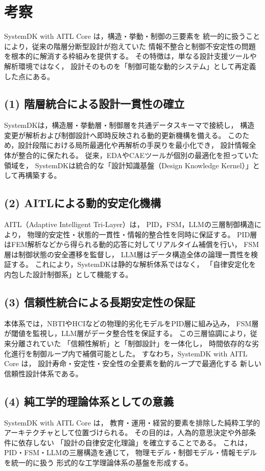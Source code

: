 \section{考察}

SystemDK with AITL Core は，構造・挙動・制御の三要素を
統一的に扱うことにより，従来の階層分断型設計が抱えていた
情報不整合と制御不安定性の問題を根本的に解消する枠組みを提供する。
その特徴は，単なる設計支援ツールや解析環境ではなく，
設計そのものを「制御可能な動的システム」として再定義した点にある。

\subsection{(1) 階層統合による設計一貫性の確立}
SystemDKは，構造層・挙動層・制御層を共通データスキーマで接続し，
構造変更が解析および制御設計へ即時反映される動的更新機構を備える。
このため，設計段階における局所最適化や再解析の手戻りを最小化でき，
設計情報全体が整合的に保たれる。
従来，EDAやCAEツールが個別の最適化を担っていた領域を，
SystemDKは統合的な「設計知識基盤（Design Knowledge Kernel）」として再構築する。

\subsection{(2) AITLによる動的安定化機構}
AITL（Adaptive Intelligent Tri-Layer）は，
PID，FSM，LLMの三層制御構造により，
物理的安定性・状態的一貫性・情報的整合性を同時に保証する。
PID層はFEM解析などから得られる動的応答に対してリアルタイム補償を行い，
FSM層は制御状態の安全遷移を監督し，
LLM層はデータ構造全体の論理一貫性を検証する。
これにより，SystemDKは静的な解析体系ではなく，
「自律安定化を内包した設計制御系」として機能する。

\subsection{(3) 信頼性統合による長期安定性の保証}
本体系では，NBTIやHCIなどの物理的劣化モデルをPID層に組み込み，
FSM層が閾値を監視し，LLM層がデータ整合性を保証する。
この三層協調により，従来分離されていた
「信頼性解析」と「制御設計」を一体化し，
時間依存的な劣化進行を制御ループ内で補償可能とした。
すなわち，SystemDK with AITL Core は，
設計寿命・安定性・安全性の全要素を動的ループで最適化する
新しい信頼性設計体系である。

\subsection{(4) 純工学的理論体系としての意義}
SystemDK with AITL Core は，
教育・運用・経営的要素を排除した純粋工学的アーキテクチャとして位置づけられる。
その目的は，人為的意思決定や外部条件に依存しない
「設計の自律安定化理論」を確立することである。
これは，PID・FSM・LLMの三層構造を通じて，
物理モデル・制御モデル・情報モデルを統一的に扱う
形式的な工学理論体系の基盤を形成する。

